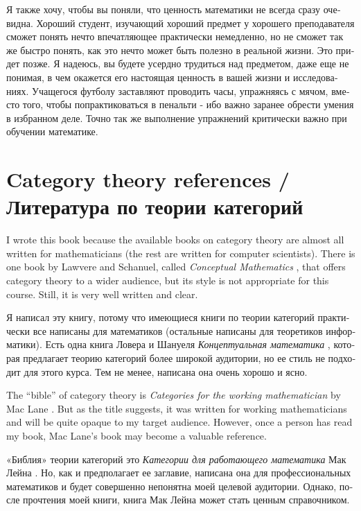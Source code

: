 \documentclass[a4paper]{book}
\theoremstyle{myth}
\begin{document}
\begin{english}
\begin{russian}Я также хочу, чтобы вы поняли, что ценность математики не всегда сразу очевидна. Хороший студент, изучающий хороший предмет у хорошего преподавателя сможет понять нечто впечатляющее практически немедленно, но не сможет так же быстро понять, как это нечто может быть полезно в реальной жизни. Это придет позже. Я надеюсь, вы будете усердно трудиться над предметом, даже еще не понимая, в чем окажется его настоящая ценность в вашей жизни и исследованиях. Учащегося футболу заставляют проводить часы, упражняясь с мячом, вместо того, чтобы попрактиковаться в пенальти - ибо важно заранее обрести умения в избранном деле. Точно так же выполнение упражнений критически важно при обучении математике. \end{russian}


\section{Category theory references / Литература по теории категорий}

I wrote this book because the available books on category theory are almost all written for mathematicians (the rest are written for computer scientists). There is one book by Lawvere and Schanuel, called {\em Conceptual Mathematics} \cite{LS}, that offers category theory to a wider audience, but its style is not appropriate for this course. Still, it is very well written and clear.

\begin{russian}Я написал эту книгу, потому что имеющиеся книги по теории категорий практически все написаны для математиков (остальные написаны для теоретиков информатики). Есть одна книга Ловера и Шануеля {\em Концептуальная математика} \cite{LS}, которая предлагает теорию категорий более широкой аудитории, но ее стиль не подходит для этого курса. Тем не менее, написана она очень хорошо и ясно. \end{russian}

The “bible” of category theory is {\em Categories for the working mathematician} by Mac Lane \cite{Mac}. But as the title suggests, it was written for working mathematicians and will be quite opaque to my target audience. However, once a person has read my book, Mac Lane's book may become a valuable reference.

\begin{russian} «Библия» теории категорий это {\em Категории для работающего математика} Мак Лейна \cite{Mac}. Но, как и предполагает ее заглавие, написана она для профессиональных математиков и будет совершенно непонятна моей целевой аудитории. Однако, после прочтения моей книги, книга Мак Лейна может стать ценным справочником.  \end{russian}


\end{english}
\end{document}
